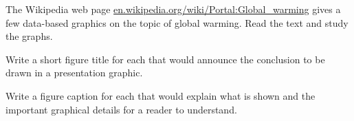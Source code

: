 \begin{Exercises}

 \exercise The Wikipedia web page \url{en.wikipedia.org/wiki/Portal:Global_warming}
   gives a few data-based graphics on the topic of global warming.  
   Read the text and study the graphs.  
   \begin{enumerate*}
	   \item Write a short figure title for each that would announce the conclusion
	   to be drawn in a presentation graphic.  
	   \item Write a figure caption for each that 
	   would explain what is shown and the important graphical details for a reader to
	   understand.
   \end{enumerate*}

\end{Exercises}
